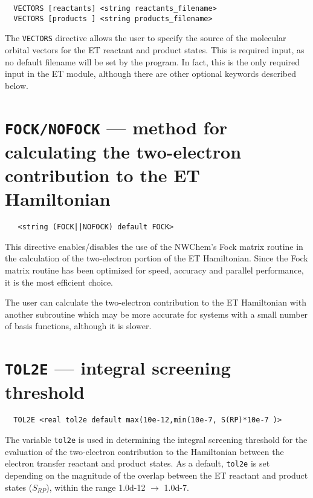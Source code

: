 \begin{verbatim}
  VECTORS [reactants] <string reactants_filename>
  VECTORS [products ] <string products_filename>
\end{verbatim}

The \verb+VECTORS+ directive allows the user to specify the source 
of the molecular orbital vectors for the ET reactant and product states. 
This is required input, as no default filename will be set by the program.
In fact, this is the only required input in the ET module, although there are
other optional keywords described below.



\section{{\tt FOCK/NOFOCK} --- method for calculating the two-electron contribution to the ET Hamiltonian}
\label{sec:fock}

 \begin{verbatim}
   <string (FOCK||NOFOCK) default FOCK>
 \end{verbatim}

This directive enables/disables the use of the NWChem's Fock matrix 
routine in the calculation of the two-electron portion of the ET Hamiltonian.
Since the Fock matrix routine has been optimized for speed, accuracy and parallel performance,
it is the most efficient choice.

The user can calculate the two-electron contribution to the ET Hamiltonian
with another subroutine which may be more accurate for systems with a small
number of basis functions, although it is slower.

\section{{\tt TOL2E} --- integral screening threshold}
\label{sec:tol2e}

\begin{verbatim}
  TOL2E <real tol2e default max(10e-12,min(10e-7, S(RP)*10e-7 )> 
\end{verbatim}

The variable \verb+tol2e+ is used in determining the integral
screening threshold for the evaluation of the two-electron contribution to the Hamiltonian
between the electron transfer reactant and product states.
As a default, \verb+tol2e+ is set depending on the magnitude
of the overlap between the ET reactant and product states ($S_{RP}$), within the range 1.0d-12 $\rightarrow$ 1.0d-7.

